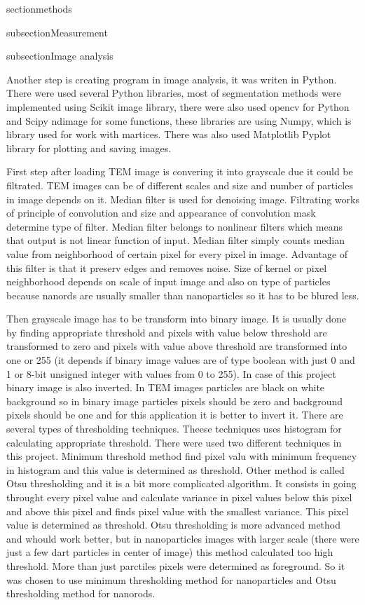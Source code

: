section{methods}

\pagestyle{plain}

subsection{Measurement}

subsection{Image analysis}

Another step is creating program in image analysis, it was writen in Python.
There were used several Python libraries, most of segmentation methods were
implemented using Scikit image library, there were also used opencv for Python
and Scipy ndimage for some functions, these libraries are using Numpy, which
is library used for work with martices. There was also used Matplotlib Pyplot
library for plotting and saving images.

First step after loading TEM image is convering it into grayscale due it could
be filtrated. TEM images can be of different scales and size and number of particles
in image depends on it. Median filter is used for denoising image. Filtrating works
of principle of convolution and size and appearance of convolution mask determine type
of filter. Median filter belongs to nonlinear filters which means that output is not
linear function of input. Median filter simply counts median value from neighborhood
of certain pixel for every pixel in image. Advantage of this filter is that it
preserv edges and removes noise. Size of kernel or pixel neighborhood depends on
scale of input image and also on type of particles because nanords are usually
smaller than nanoparticles so it has to be blured less.

Then grayscale image has to be transform into binary image. It is usually done
by finding appropriate threshold and pixels with value below threshold are 
transformed to zero and pixels with value above threshold are transformed into
one or 255 (it depends if binary image values are of type boolean with just 0 and 1
or 8-bit unsigned integer with values from 0 to 255). In case of this project
binary image is also inverted. In TEM images particles are black on white background
so in binary image particles pixels should be zero and background pixels should be one
and for this application it is better to invert it. There are several types of
thresholding techniques. Theese techniques uses histogram for calculating
appropriate threshold. There were used two different techniques in this project.
Minimum threshold method find pixel valu with minimum frequency in histogram and
this value is determined as threshold. Other method is called Otsu thresholding
and it is a bit more complicated algorithm. It consists in going throught every
pixel value and calculate variance in pixel values below this pixel and above this pixel
and finds pixel value with the smallest variance. This pixel value is determined as
threshold. Otsu thresholding is more advanced method and whould work better, but
in nanoparticles images with larger scale (there were just a few dart particles in center
of image) this method calculated too high threshold. More than just parctiles pixels
were determined as foreground. So it was chosen to use minimum thresholding method for
nanoparticles and Otsu thresholding method for nanorods.

